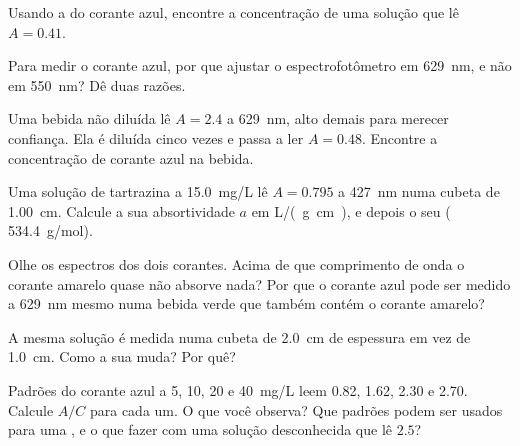 \begin{exercise}[$\star\star$]\label{exo:g11:absorbance:6}
Usando a  do corante azul, encontre a concentração de
uma solução que lê $A = 0.41$.
\end{exercise}

\begin{exercise}[$\star\star$]\label{exo:g11:absorbance:7}
Para medir o corante azul, por que ajustar o espectrofotômetro em
\qty{629}{nm}, e não em \qty{550}{nm}? Dê duas razões.
\end{exercise}

\begin{exercise}[$\star\star$]\label{exo:g11:absorbance:8}
Uma bebida não diluída lê $A = 2.4$ a \qty{629}{nm}, alto demais para
merecer confiança. Ela é diluída cinco vezes e passa a ler $A = 0.48$.
Encontre a concentração de corante azul na bebida.
\end{exercise}

\begin{exercise}[$\star\star$]\label{exo:g11:absorbance:9}
Uma solução de tartrazina a \qty{15.0}{mg/L} lê $A = 0.795$ a
\qty{427}{nm} numa cubeta de \qty{1.00}{cm}. Calcule a sua absortividade
$a$ em \si{L/(g.cm)}, e depois o seu 
( \qty{534.4}{g/mol}).
\end{exercise}

\begin{exercise}[$\star\star$]\label{exo:g11:absorbance:10}
Olhe os espectros dos dois corantes. Acima de que comprimento de onda o
corante amarelo quase não absorve nada? Por que o corante azul pode ser
medido a \qty{629}{nm} mesmo numa bebida verde que também contém o
corante amarelo?
\end{exercise}

\begin{exercise}[$\star\star$]\label{exo:g11:absorbance:11}
A mesma solução é medida numa cubeta de \qty{2.0}{cm} de espessura em
vez de \qty{1.0}{cm}. Como a sua  muda? Por quê?
\end{exercise}

\begin{exercise}[$\star\star\star$]\label{exo:g11:absorbance:12}
Padrões do corante azul a 5, 10, 20 e \qty{40}{mg/L} leem 0.82, 1.62,
2.30 e 2.70. Calcule $A / C$ para cada um. O que você observa? Que
padrões podem ser usados para uma , e o que fazer com
uma solução desconhecida que lê $2.5$?
\end{exercise}

